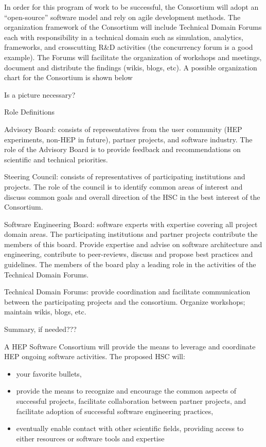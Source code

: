 \documentclass[12pt,letterpaper,fleqn]{article}
\begin{document}
In order for this program of work to be successful, the Consortium
will adopt an “open-source” software model and rely on agile
development methods.  The organization framework of the Consortium
will include Technical Domain Forums each with responsibility in a
technical domain such as simulation, analytics, frameworks, and
crosscutting R\&D activities (the concurrency forum is a good example).
The Forums will facilitate the organization of workshops and meetings,
document and distribute the findings (wikis, blogs, etc).   A
possible organization chart for the Consortium is shown below

Is a picture necessary?

Role Definitions

Advisory Board: consists of representatives from the user community
(HEP experiments, non-HEP in future), partner projects, and software
industry.  The role of the Advisory Board is to provide feedback
and recommendations on scientific and technical priorities.

Steering Council: consists of representatives of participating
institutions and projects.  The role of the council is to identify
common areas of interest and discuss common goals and overall
direction of the HSC in the best interest of the Consortium.

Software Engineering Board: software experts with expertise covering
all project domain areas. The participating institutions and partner
projects contribute the members of this board.  Provide expertise
and advise on software architecture and engineering, contribute to
peer-reviews, discuss and propose best practices and guidelines.
The members of the board play a leading role in the activities of
the Technical Domain Forums.

Technical Domain Forums: provide coordination and facilitate
communication between the participating projects and the consortium.
Organize workshops; maintain wikis, blogs, etc.


Summary, if needed???

A HEP Software Consortium will provide the means to leverage and
coordinate HEP ongoing software activities.  The proposed HSC will:
\begin{itemize}
\item your favorite bullets,
\item provide the means to recognize and encourage the common aspects
of successful projects, facilitate collaboration between partner
projects, and facilitate adoption of successful software engineering
practices,
\item eventually enable contact with other scientific fields,
providing access to either resources or software tools and expertise
\end{itemize}



\newpage

%
%
\end{document}

